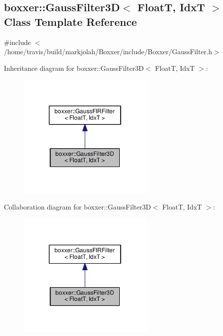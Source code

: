\hypertarget{classboxxer_1_1GaussFilter3D}{}\subsection{boxxer\+:\+:Gauss\+Filter3D$<$ FloatT, IdxT $>$ Class Template Reference}
\label{classboxxer_1_1GaussFilter3D}


{\ttfamily \#include $<$/home/travis/build/markjolah/\+Boxxer/include/\+Boxxer/\+Gauss\+Filter.\+h$>$}



Inheritance diagram for boxxer\+:\+:Gauss\+Filter3D$<$ FloatT, IdxT $>$\+:\nopagebreak
\begin{figure}[H]
\begin{center}
\leavevmode
\includegraphics[width=190pt]{classboxxer_1_1GaussFilter3D__inherit__graph}
\end{center}
\end{figure}


Collaboration diagram for boxxer\+:\+:Gauss\+Filter3D$<$ FloatT, IdxT $>$\+:\nopagebreak
\begin{figure}[H]
\begin{center}
\leavevmode
\includegraphics[width=190pt]{classboxxer_1_1GaussFilter3D__coll__graph}
\end{center}
\end{figure}
